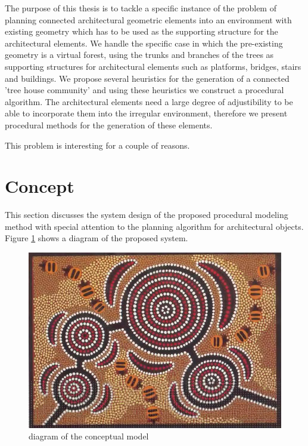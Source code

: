 \documentclass{article}
\begin{document}
The purpose of this thesis is to tackle a specific instance of the problem of planning connected architectural geometric elements into an environment with existing geometry which has to be used as the supporting structure for the architectural elements. We handle the specific case in which the pre-existing geometry is a virtual forest, using the trunks and branches of the trees as supporting structures for architectural elements such as platforms, bridges, stairs and buildings. We propose several heuristics for the generation of a connected 'tree house community' and using these heuristics we construct a procedural algorithm. The architectural elements need a large degree of adjustibility to be able to incorporate them into the irregular environment, therefore we present procedural methods for the generation of these elements.       






This problem is interesting for a couple of reasons.


\section{Concept}
\label{sec:concept}


This section discusses the system design of the proposed procedural modeling method with special attention to the planning algorithm for architectural objects. Figure \ref{fig:conceptualmodel} shows a diagram of the proposed system.

\begin{figure}[htbp]
	\centering
		\includegraphics{images/aboriginal_art.jpg}
	\caption{diagram of the conceptual model}
	\label{fig:conceptualmodel}
\end{figure}
\end{document}
